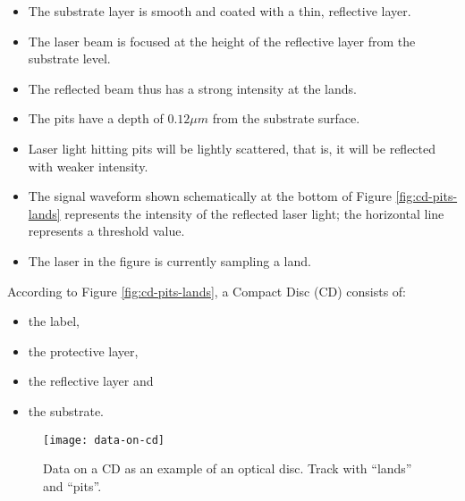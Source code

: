 \begin{itemize}
	\item The substrate layer is smooth and coated with a thin, reflective layer. 
	\item The laser beam is focused at the height of the reflective layer from the substrate level. 
	\item The reflected beam thus has a strong intensity at the lands. 
	\item The pits have a depth of $ 0.12\mu m $ from the substrate surface. 
	\item Laser light hitting pits will be lightly scattered, that is, it will be reflected with weaker intensity. 
	\item The signal waveform shown schematically at the bottom of Figure {\ref{fig:cd-pits-lands}} represents the intensity of the reflected laser light; the horizontal
	line represents a threshold value. 
	\item The laser in the figure is currently sampling a land.
\end{itemize}

According to Figure {\ref{fig:cd-pits-lands}}, a Compact Disc (CD) consists of:
\begin{multicols}{2}
	\begin{itemize}
		\item the label,
		\item the protective layer,
		\item the reflective layer and
		\item the substrate.
	\end{itemize}
\end{multicols}

\begin{figure}[ht!]
	\centering
	\texttt{[image: data-on-cd]}
	\caption[Data on a CD as an example of an optical disc]{Data on a CD as an example of an optical disc. Track with ``lands'' and ``pits''.}{\label{fig:data-on-cd}}
\end{figure}

